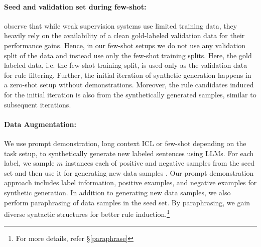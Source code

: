 \paragraph{Seed and validation set during few-shot: } \citet{zhu-etal-2023-weaker} observe that while weak supervision systems use limited training data, they heavily rely on the availability of a clean gold-labeled validation data for their performance gains. Hence, in our few-shot setups we do not use any validation split of the data and instead use only the few-shot training splits. Here, the gold labeled data, i.e. the few-shot training split,  is  used only as the validation data for rule filtering. Further, the initial iteration of synthetic generation happens in a zero-shot setup without demonstrations. Moreover, the rule candidates induced for the initial iteration is also from the synthetically generated samples, similar to subsequent iterations. 











 

\paragraph{Data Augmentation:} We use prompt demonstration, long context ICL or few-shot depending on the task setup, to synthetically generate new labeled sentences using LLMs. For each label, we sample $m$ instances each of positive and negative samples from the seed set and then use it for generating new data samples \cite{10.1145/3617130smithLoop,lin-etal-2023-selective}. Our prompt demonstration approach includes label information, positive examples, and negative examples for synthetic generation. In addition to generating new data samples, we also perform paraphrasing of data samples in the seed set. By paraphrasing, we gain diverse syntactic structures for better rule induction.\footnote{For more details, refer \S \ref{paraphrase}} 



